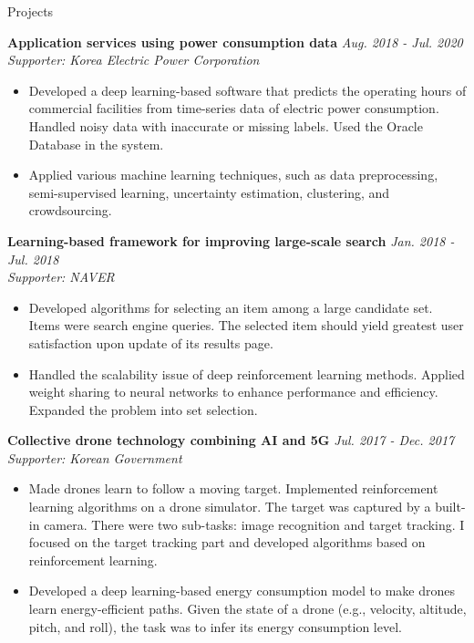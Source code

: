 \documentclass{resume} %
\begin{document}
\begin{rSection}{Projects}

%	
\textbf{Application services using power consumption data}
\hfill \textit{Aug. 2018 - Jul. 2020}\\
\textit{Supporter: Korea Electric Power Corporation}
\begin{itemize}
	\item Developed a deep learning-based software that predicts the operating hours of commercial facilities from time-series data of electric power consumption. Handled noisy data with inaccurate or missing labels. Used the Oracle Database in the system.
	\item Applied various machine learning techniques, such as data preprocessing, semi-supervised learning, uncertainty estimation, clustering, and crowdsourcing.
\end{itemize}

\textbf{Learning-based framework for improving large-scale search}
\hfill \textit{Jan. 2018 - Jul. 2018}\\
\textit{Supporter: NAVER}
\begin{itemize}
	\item Developed algorithms for selecting an item among a large candidate set. Items were search engine queries. The selected item should yield greatest user satisfaction upon update of its results page.
	\item Handled the scalability issue of deep reinforcement learning methods. Applied weight sharing to neural networks to enhance performance and efficiency. Expanded the problem into set selection.
	
\end{itemize}

\textbf{Collective drone technology combining AI and 5G}
\hfill \textit{Jul. 2017 - Dec. 2017}\\
\textit{Supporter: Korean Government}
\begin{itemize}
	\item Made drones learn to follow a moving target. Implemented reinforcement learning algorithms on a drone simulator. The target was captured by a built-in camera. There were two sub-tasks: image recognition and target tracking. I focused on the target tracking part and developed algorithms based on reinforcement learning.
	\item Developed a deep learning-based energy consumption model to make drones learn energy-efficient paths. Given the state of a drone (e.g., velocity, altitude, pitch, and roll), the task was to infer its energy consumption level.
\end{itemize}

\end{rSection}
\end{document}
